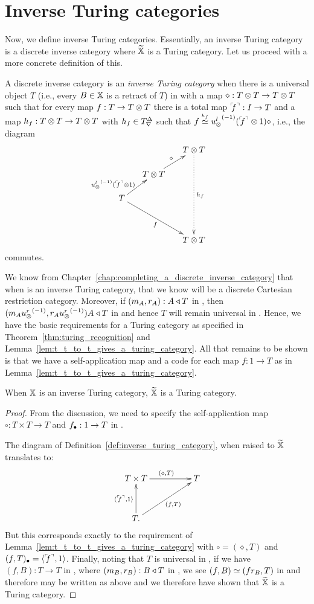 \section{Inverse Turing categories}
\label{sec:inverse_turing_categories}
Now, we define inverse Turing categories. Essentially, an inverse Turing category is a discrete
inverse category \X where $\widetilde{\mathbb{X}}$ is a Turing category. Let us proceed with a more concrete
definition of this.

\begin{definition}\label{def:inverse_turing_category}
  A discrete inverse category \X is an \emph{inverse Turing category} when there is a universal
  object $T$ (i.e., every $B\in\mathbb{X}$ is a retract of $T$) in
  \X with a map $\diamond :T\otimes T \to T\otimes T$ such that for every map $f:T \to T\otimes T$ there is a total map
  ${}^\ulcorner\!\!f^\urcorner: I\to T$ and a map $h_f:T\otimes T \to T\otimes T$ with $h_f \in {T}^{\Delta}_{\nabla}$ such that $f \overset{\scriptscriptstyle h_f}{\simeq}
  {u_{\otimes}^l}^{(-1)}({}^\ulcorner\!\!f^\urcorner\otimes1)\diamond$, i.e., the diagram
  \[
    \xymatrix @C=15pt @R=15pt{
      & & T \* T \ar@{.>}[dddd]^{h_f}\\
      &T\*T \ar[ur]^{\diamond} & & \\
      T \ar[ur]^(.3){\inv{\usl}(\iname{f}\*1)} \ar[ddrr]_{f} \\
      & & & \\
      && T\*T
    }
  \]
  commutes.
\end{definition}

We know from Chapter~\ref{chap:completing_a_discrete_inverse_category} that when \X is an inverse
Turing category, that we know \Xt will be a discrete Cartesian restriction category. Moreover, if
$(m_A,r_A):A\triangleleft T$ in \X, then $(m_A{u_{\otimes}^r}^{(-1)},r_A{u_{\otimes}^r}^{(-1)})A \triangleleft T$ in \Xt and hence $T$
will remain universal in \Xt. Hence, we have the basic requirements for a Turing category as
specified in Theorem~\ref{thm:turing_recognition} and
Lemma~\ref{lem:t_t_to_t_gives_a_turing_category}. All that remains to be shown is that we have a
self-application map and a code for each map $f:1\to T$ as in Lemma~\ref{lem:t_t_to_t_gives_a_turing_category}.
\begin{theorem}\label{thm:inverse_turing_category_gives_a_turing_category}
  When $\mathbb{X}$ is an inverse Turing category, $\widetilde{\mathbb{X}}$ is a Turing category.
\end{theorem}
\begin{proof}
  From the discussion, we need to specify the self-application map $\circ:T\times T \to T$ and
  $f_{\bullet}:1 \to T$ in \Xt.

  The diagram of Definition~\ref{def:inverse_turing_category}, when raised to $\widetilde{\mathbb{X}}$
  translates to:
  \[
    \xymatrix@C+25pt@R+10pt{
      T \times T \ar[r]^{(\diamond, T)} &T \\
      T. \ar[u]^{\<\iname{f},1\>} \ar[ur]_{(f, T)}
    }
  \]
  But this corresponds exactly to the requirement of
  Lemma~\ref{lem:t_t_to_t_gives_a_turing_category} with $\circ = (\diamond,T)$ and $(f,T)_{\bullet} =
  \langle{}^\ulcorner\!\!f^\urcorner,1\rangle$.  Finally, noting that $T$ is universal in \X, if we have $(f,B):T\to T$ in \Xt,
  where $(m_B,r_B):B\triangleleft T$ in \X, we see $(f,B) \overset{\scriptscriptstyle }{\simeq} (fr_B,T)$ in \X and therefore may be
  written as above and we therefore have shown that $\widetilde{\mathbb{X}}$ is a Turing category.
\end{proof}


